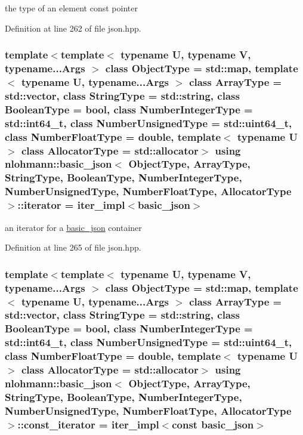 the type of an element const pointer 



Definition at line 262 of file json.\+hpp.

\hypertarget{classnlohmann_1_1basic__json_ae3c77a8f03096da2a32a3de0c317d445}{}
\subsubsection[{iterator}]{\setlength{\rightskip}{0pt plus 5cm}template$<$template$<$ typename U, typename V, typename...\+Args $>$ class Object\+Type = std\+::map, template$<$ typename U, typename...\+Args $>$ class Array\+Type = std\+::vector, class String\+Type  = std\+::string, class Boolean\+Type  = bool, class Number\+Integer\+Type  = std\+::int64\+\_\+t, class Number\+Unsigned\+Type  = std\+::uint64\+\_\+t, class Number\+Float\+Type  = double, template$<$ typename U $>$ class Allocator\+Type = std\+::allocator$>$ using {\bf nlohmann\+::basic\+\_\+json}$<$ Object\+Type, Array\+Type, String\+Type, Boolean\+Type, Number\+Integer\+Type, Number\+Unsigned\+Type, Number\+Float\+Type, Allocator\+Type $>$\+::{\bf iterator} =  {\bf iter\+\_\+impl}$<${\bf basic\+\_\+json}$>$}\label{classnlohmann_1_1basic__json_ae3c77a8f03096da2a32a3de0c317d445}


an iterator for a \hyperlink{classnlohmann_1_1basic__json}{basic\+\_\+json} container 



Definition at line 265 of file json.\+hpp.

\hypertarget{classnlohmann_1_1basic__json_a2b53a089e945e75deaac6782aa942a77}{}
\subsubsection[{const\+\_\+iterator}]{\setlength{\rightskip}{0pt plus 5cm}template$<$template$<$ typename U, typename V, typename...\+Args $>$ class Object\+Type = std\+::map, template$<$ typename U, typename...\+Args $>$ class Array\+Type = std\+::vector, class String\+Type  = std\+::string, class Boolean\+Type  = bool, class Number\+Integer\+Type  = std\+::int64\+\_\+t, class Number\+Unsigned\+Type  = std\+::uint64\+\_\+t, class Number\+Float\+Type  = double, template$<$ typename U $>$ class Allocator\+Type = std\+::allocator$>$ using {\bf nlohmann\+::basic\+\_\+json}$<$ Object\+Type, Array\+Type, String\+Type, Boolean\+Type, Number\+Integer\+Type, Number\+Unsigned\+Type, Number\+Float\+Type, Allocator\+Type $>$\+::{\bf const\+\_\+iterator} =  {\bf iter\+\_\+impl}$<$const {\bf basic\+\_\+json}$>$}\label{classnlohmann_1_1basic__json_a2b53a089e945e75deaac6782aa942a77}


